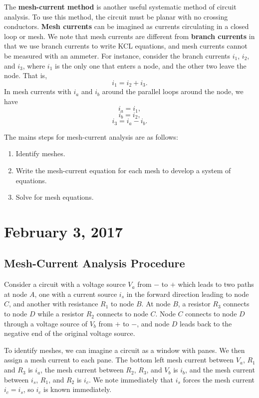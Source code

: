 \documentclass[11pt]{article}
\theoremstyle{plain} %
\theoremstyle{definition}
\theoremstyle{example}
\theoremstyle{remark}
\begin{document}
The \textbf{mesh-current method} is another useful systematic method of circuit analysis. To use this method, the circuit must be planar with no crossing conductors. \textbf{Mesh currents} can be 
imagined as currents circulating in a closed loop or mesh. We note that mesh currents are different from \textbf{branch currents} in that we use branch currents to write KCL equations, and mesh currents cannot be measured with an ammeter. For instance, consider the branch currents $i_1$, $i_2$, and $i_3$, where $i_1$ is the only one that enters a node, and the other two leave the node. That is, 
$$i_1 = i_2+i_3.$$
In mesh currents with $i_a$ and $i_b$ around the parallel loops around the node, we have 
$$i_a = i_1,$$
$$i_b = i_2,$$
$$i_3 = i_a-i_b.$$

The mains steps for mesh-current analysis are as follows:
\begin{enumerate}
	\item Identify meshes.
	\item Write the mesh-current equation for each mesh to develop a system of equations.
	\item Solve for mesh equations.
\end{enumerate}

\section{February 3, 2017}
\subsection{Mesh-Current Analysis Procedure}

Consider a circuit with a voltage source $V_a$ from $-$ to $+$ which leads to two paths at node $A$, one with a current source $i_s$ in the forward direction leading to node $C$, and another with resistance $R_1$ to node $B$. At node $B$, a resistor $R_3$ connects to node $D$ while a resistor $R_2$ connects to node $C$. Node $C$ connects to node $D$ through a voltage source of $V_b$ from $+$ to $-$, and node $D$ leads back to the negative end of the original voltage source.

To identify meshes, we can imagine a circuit as a window with panes. We then assign a mesh current to each pane. The bottom left mesh current between $V_a$, $R_1$ and $R_3$ is $i_a$, the mesh current between $R_2$, $R_3$, and $V_b$ is $i_b$, and the mesh current between $i_s$, $R_1$, and $R_2$ is $i_c$. We note immediately that $i_s$ forces the mesh current $i_c = i_s$, so $i_c$ is known immediately. 
\end{document}

